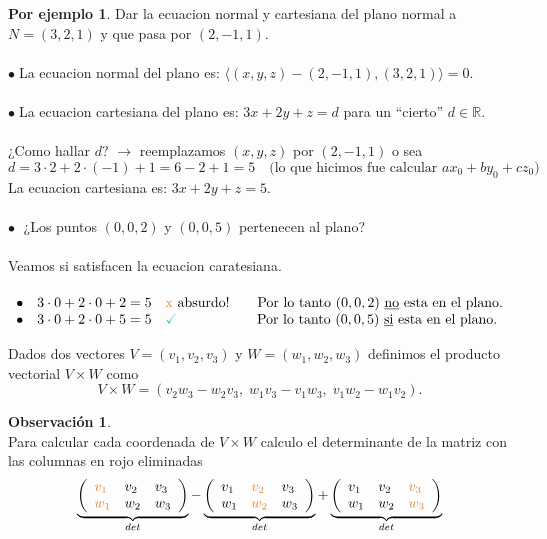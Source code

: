 \documentclass{article}
\theoremstyle{definition}
\theoremstyle{definition}
\newtheorem*{obs}{Observación}
\newtheorem*{ej}{Por ejemplo}
\theoremstyle{remark}
\newcommand\bl{$\bullet\;$}
\newcommand\ok{\checkmark}
\begin{document}
\begin{ej}
  Dar la ecuacion normal y cartesiana del plano normal a \\ $N=(3,2,1)$ y que pasa por $(2,-1,1)$. \\\\ \bl La ecuacion normal del plano es: $ \langle (x,y,z)-(2,-1,1),(3,2,1) \rangle = 0 $. \\ \\ 
  \bl La ecuacion cartesiana del plano es: $3x+2y+z=d$ para un ``cierto'' $d \in \mathbb{R}$.
  \\\\
  ¿Como hallar $d$? $\to$ reemplazamos $(x,y,z)$ por $(2,-1,1)$ o sea \[ 
  d=3\cdot 2 + 2 \cdot (-1) + 1 = 6 - 2 + 1 = 5 \quad \text{(lo que hicimos fue calcular } ax_0+by_0+cz_0 \text{)}
  \] La ecuacion cartesiana es: $3x+2y+z=5$.
  \\\\ \textcolor{rojop2}{\bl} ¿Los puntos $(0,0,2)$ y $(0,0,5)$ pertenecen al plano? \\\\ Veamos si satisfacen la ecuacion caratesiana.\\\\ $\begin{array}{llll}
    \bullet \quad 3 \cdot 0 + 2 \cdot 0 + 2 = 5 \quad \text{\textcolor{rojop2}{x} absurdo!} \quad \quad \text{Por lo tanto } (0,0,2) \text{ \underline{no}  esta en el plano.} \\     \bullet \quad 3 \cdot 0 + 2 \cdot 0 + 5 = 5 \quad \text{\textcolor{verdep2}{\ok}\phantom{absurdo!}} \quad \quad \text{Por lo tanto } (0,0,5) \text{ \underline{si}  esta en el plano.}
 \end{array}$
\end{ej}

\begin{defi}
  Dados dos vectores $V=(v_1,v_2,v_3)$ y $W=(w_1,w_2,w_3)$ definimos el producto vectorial $V \times W $ como \[
  V \times W = (v_2w_3-w_2v_3,\; w_1v_3-v_1w_3, \; v_1w_2-w_1v_2).
  \]
\end{defi}
\begin{obs} \; \\ Para calcular cada coordenada de $V \times W$ calculo el determinante de la matriz con las columnas en rojo eliminadas\\
  $$\underbrace{\left(\begin{array}{lll}
      \textcolor{rojop2}{v_1} & v_2 & v_3 \\ 
      \textcolor{rojop2}{w_1} & w_2 & w_3 
\end{array}\right)}_{det}
  -
  \underbrace{\left(\begin{array}{lll} 
      v_1 & \textcolor{rojop2}{v_2} & v_3 \\ 
      w_1 & \textcolor{rojop2}{w_2} & w_3 
\end{array}\right)}_{det}
  +
  \underbrace{\left(\begin{array}{lll}
      v_1 & v_2 & \textcolor{rojop2}{v_3} \\ 
        w_1 & w_2 & \textcolor{rojop2}{w_3} 
  \end{array}\right)}_{det}$$
\end{obs}
\end{document}
